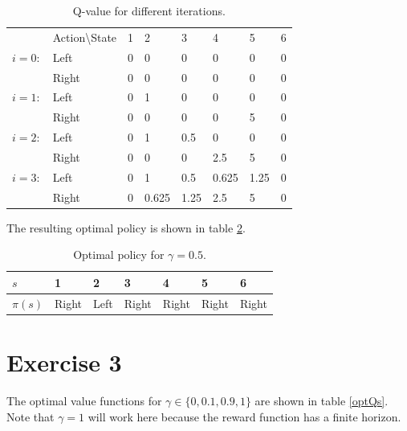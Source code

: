 \documentclass [a4paper] {report}
\begin{document}
	\begin{table}[H]
		\centering
		\caption{Q-value for different iterations.}
		\label{Qtable}
		\begin{tabular}{ll|llllll}
			& Action\textbackslash State    & 1 & 2 & 3 & 4 & 5 & 6 \\ \cmidrule{2-8}
	$i=0:$	& Left 				& 0 & 0 & 0 & 0 & 0 & 0 \\ 
			& Right 			& 0 & 0 & 0 & 0 & 0 & 0 \\ \cmidrule{2-8}
	$i=1:$	& Left 				& 0 & 1 & 0 & 0 & 0 & 0 \\ 
			& Right 			& 0 & 0 & 0 & 0 & 5 & 0 \\ \cmidrule{2-8}
	$i=2:$	& Left 				& 0 & 1 & 0.5 & 0 & 0 & 0 \\ 
			& Right 			& 0 & 0 & 0 & 2.5 & 5 & 0 \\ \cmidrule{2-8}
	$i=3:$	& Left 				& 0 & 1 & 0.5 & 0.625 & 1.25 & 0 \\ 
			& Right 			& 0 & 0.625 & 1.25 & 2.5 & 5 & 0 \\ 
		\end{tabular}		
	\end{table}
	
	\noindent
	The resulting optimal policy is shown in table \ref{optPolicy}.
	
	\begin{table}[H]
		\centering
		\caption{Optimal policy for $\gamma=0.5$.}
		\label{optPolicy}
		\begin{tabular}{l|llllll}
			$s$    			& 1 & 2 & 3 & 4 & 5 & 6 \\ \hline
			$\pi(s)$			& Right & Left & Right & Right & Right & Right \\ 
		\end{tabular}
	\end{table}
	
	
	\section*{Exercise 3}
	The optimal value functions for $\gamma \in \{ 0,0.1, 0.9, 1 \}$ are shown in table \ref{optQs}.
	Note that $\gamma=1$ will work here because the reward function has a finite horizon.
	
\end{document}
